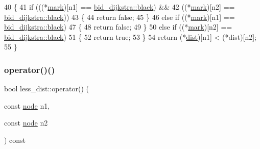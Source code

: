 \begin{DoxyCode}
40     \{
41     \textcolor{keywordflow}{if} (((*\mbox{\hyperlink{classless__dist_a7905c2d559b1b629175fc810c643375c}{mark}})[n1] == \mbox{\hyperlink{classbid__dijkstra_a8b7dcccc9fab2ec5edc8da01029c09d5acc2693da1b850fc6c7e79aef42fae336}{bid\_dijkstra::black}}) &&
42         ((*\mbox{\hyperlink{classless__dist_a7905c2d559b1b629175fc810c643375c}{mark}})[n2] == \mbox{\hyperlink{classbid__dijkstra_a8b7dcccc9fab2ec5edc8da01029c09d5acc2693da1b850fc6c7e79aef42fae336}{bid\_dijkstra::black}}))
43     \{
44         \textcolor{keywordflow}{return} \textcolor{keyword}{false};
45     \}
46     \textcolor{keywordflow}{else} \textcolor{keywordflow}{if} ((*\mbox{\hyperlink{classless__dist_a7905c2d559b1b629175fc810c643375c}{mark}})[n1] == \mbox{\hyperlink{classbid__dijkstra_a8b7dcccc9fab2ec5edc8da01029c09d5acc2693da1b850fc6c7e79aef42fae336}{bid\_dijkstra::black}})
47     \{
48         \textcolor{keywordflow}{return} \textcolor{keyword}{false};
49     \}
50     \textcolor{keywordflow}{else} \textcolor{keywordflow}{if} ((*\mbox{\hyperlink{classless__dist_a7905c2d559b1b629175fc810c643375c}{mark}})[n2] == \mbox{\hyperlink{classbid__dijkstra_a8b7dcccc9fab2ec5edc8da01029c09d5acc2693da1b850fc6c7e79aef42fae336}{bid\_dijkstra::black}})
51     \{
52         \textcolor{keywordflow}{return} \textcolor{keyword}{true};
53     \}
54     \textcolor{keywordflow}{return} (*\mbox{\hyperlink{classless__dist_a5e27ffa3cd5b99bcf5c205fc021ddbb8}{dist}})[n1] < (*dist)[n2];
55     \}
\end{DoxyCode}
\mbox{\label{classless__dist_ad60cec2a03ca609f0f4af0818ee9caeb}} 
\subsubsection{\texorpdfstring{operator()()}{operator()()}\hspace{0.1cm}{\footnotesize\ttfamily [2/2]}}
{\footnotesize\ttfamily bool less\+\_\+dist\+::operator() (\begin{DoxyParamCaption}\item[{const \mbox{\hyperlink{classnode}{node}}}]{n1,  }\item[{const \mbox{\hyperlink{classnode}{node}}}]{n2 }\end{DoxyParamCaption}) const\hspace{0.3cm}{\ttfamily [inline]}}



